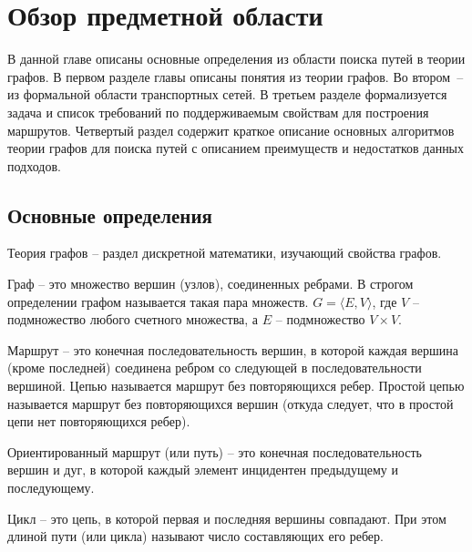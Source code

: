 \chapter{Обзор предметной области}
В данной главе описаны основные определения из области поиска путей в теории графов. В первом разделе главы описаны понятия из теории графов. Во втором~-- из формальной области транспортных сетей. В третьем разделе формализуется задача и список требований по поддерживаемым свойствам для построения маршрутов. Четвертый раздел содержит краткое описание основных алгоритмов теории графов для поиска путей с описанием преимуществ и недостатков данных подходов.

\section{Основные определения}
\begin{definition}
Теория графов -- раздел дискретной математики, изучающий свойства графов.
\end{definition}

\begin{definition}
Граф -- это множество вершин (узлов), соединенных ребрами. В строгом определении графом называется такая пара множеств. $G=\langle E, V \rangle$, где $V$ -- подмножество любого счетного множества, а $E$ -- подмножество $V \times V$.
\end{definition}

\begin{definition}
Маршрут -- это конечная последовательность вершин, в которой каждая вершина (кроме последней) соединена ребром со следующей в последовательности вершиной. Цепью называется маршрут без повторяющихся ребер. Простой цепью называется маршрут без повторяющихся вершин (откуда следует, что в простой цепи нет повторяющихся ребер).
\end{definition}

\begin{definition}
Ориентированный маршрут (или путь) -- это конечная последовательность вершин и дуг, в которой каждый элемент инцидентен предыдущему и последующему.
\end{definition}

\begin{definition}
Цикл -- это цепь, в которой первая и последняя вершины совпадают. При этом длиной пути (или цикла) называют число составляющих его ребер.
\end{definition}

